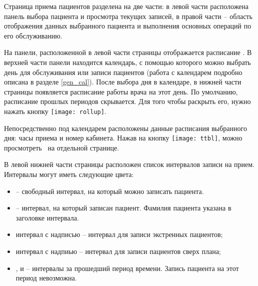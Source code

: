 {Страница приема пациентов разделена на две части: в левой части расположена панель выбора пациента и просмотра текущих записей, в правой части -- область отображения данных выбранного пациента и выполнения основных операций по его обслуживанию.

На панели, расположенной в левой части страницы отображается расписание    . В верхней части панели находится календарь, с помощью которого можно выбрать день для обслуживания или записи пациентов (работа с календарем подробно описана в разделе \ref{gen_cal}). После выбора дня в календаре, в нижней части страницы появляется расписание работы врача  на этот день. По умолчанию, расписание прошлых периодов скрывается. Для того чтобы раскрыть его, нужно нажать кнопку \texttt{[image: rollup]}.    

Непосредственно под календарем расположены данные расписания выбранного дня: часы приема и номер кабинета. Нажав на кнопку \texttt{[image: ttbl]}, можно просмотреть   ~на отдельной странице.

В левой нижней части страницы расположен список интервалов записи на прием. Интервалы могут иметь следующие цвета:
\begin{itemize}
	\item {} -- свободный интервал, на который можно записать пациента.
	\item {} -- интервал, на который записан пациент. Фамилия пациента указана в заголовке интервала.
	\item {} интервал с надписью  -- интервал для записи экстренных пациентов;
	\item {} интервал с надпиью  -- интервал для записи пациентов сверх плана;
	\item {},  и  -- интервалы за прошедший период времени. Запись пациента на этот период невозможна. 
\end{itemize}

}

